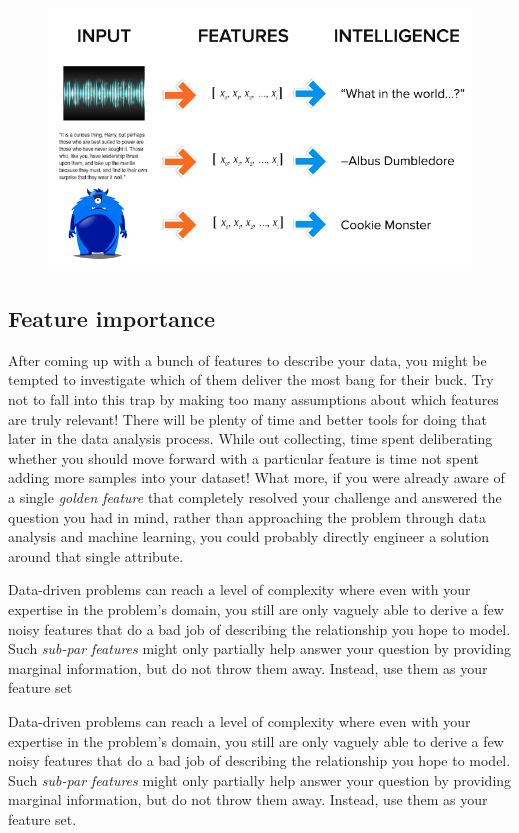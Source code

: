 \documentclass{article}
\begin{document}
\begin{figure}[H]
\centering
\includegraphics[width=.8\linewidth]{pic/determining-features.png}
\end{figure}
  
\subsection{Feature importance}
\par After coming up with a bunch of features to describe your data, you might be tempted to investigate which of them deliver the most bang for their buck. Try not to fall into this trap by making too many assumptions about which features are truly relevant! There will be plenty of time and better tools for doing that later in the data analysis process. While out collecting, time spent deliberating whether you should move forward with a particular feature is time not spent adding more samples into your dataset! What more, if you were already aware of a single {\it{golden feature}}  that completely resolved your challenge and answered the question you had in mind, rather than approaching the problem through data analysis and machine learning, you could probably directly engineer a solution around that single attribute.

\par Data-driven problems can reach a level of complexity where even with your expertise in the problem's domain, you still are only vaguely able to derive a few noisy features that do a bad job of describing the relationship you hope to model. Such {\it{sub-par features}} might only partially help answer your question by providing marginal information, but do not throw them away. Instead, use them as your feature set

\par Data-driven problems can reach a level of complexity where even with your expertise in the problem's domain, you still are only vaguely able to derive a few noisy features that do a bad job of describing the relationship you hope to model. Such {\it{sub-par features}} might only partially help answer your question by providing marginal information, but do not throw them away. Instead, use them as your feature set.
\end{document}
